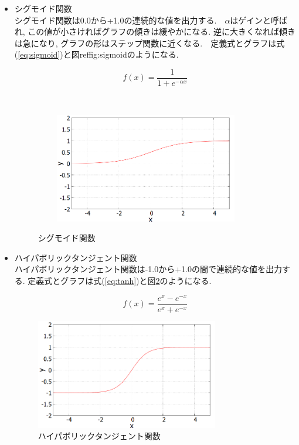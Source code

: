 \begin{itemize}
  \item{シグモイド関数}\\
シグモイド関数は0.0から+1.0の連続的な値を出力する.　$\alpha$はゲインと呼ばれ, この値が小さければグラフの傾きは緩やかになる.
逆に大きくなれば傾きは急になり, グラフの形はステップ関数に近くなる.　定義式とグラフは式(\ref{eq:sigmoid})と図ref{fig:sigmoid}のようになる.

\begin{equation}
　　f(x) = \frac{1}{1+e^{-\alpha x}}
　　\label{eq:sigmoid}
\end{equation}

\begin{figure}[htbp]
　　\begin{center}
　　  \includegraphics[clip, width=8.0cm]{./images/Sigmoid.png}
    \caption{シグモイド関数}
    \label{fig:sigmoid}
  \end{center}
\end{figure}

  \item{ハイパボリックタンジェント関数}\\
ハイパボリックタンジェント関数は-1.0から+1.0の間で連続的な値を出力する. 定義式とグラフは式(\ref{eq:tanh})と図\ref{fig:tanh}のようになる.

\begin{equation}
　　f(x) = \frac{e^x-e^{-x}}{e^x+e^{-x}}
　　\label{eq:tanh}
\end{equation}

\begin{figure}[htbp]
  \begin{center}
    \includegraphics[clip, width=8.0cm]{./images/tanh.png}
    \caption{ハイパボリックタンジェント関数}
    \label{fig:tanh}
  \end{center}
\end{figure}
\end{itemize}

